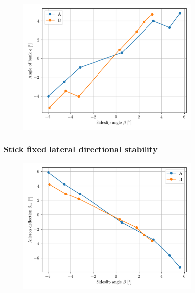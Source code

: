 \documentclass{article}
\begin{document}
\begin{figure}[H]
    \centering
    \includegraphics[width=0.8\textwidth]{Lat_Directional_Static_Stability_SHSS_1.png}
    \caption{}
    \label{fig:Lat_Directional_Static_Stability_SHSS_1}
\end{figure}

\subsubsection{Stick fixed lateral directional stability}
\begin{figure}[H]
    \centering
    \includegraphics[width=0.8\textwidth]{Lat_Directional_Static_Stability_SHSS_2.png}
    \caption{}
    \label{fig:Lat_Directional_Static_Stability_SHSS_2}
\end{figure}
\end{document}
